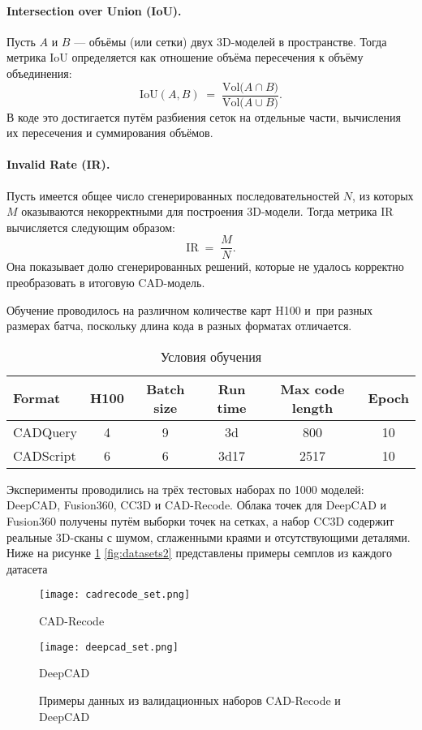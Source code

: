 \paragraph{Intersection over Union (IoU).}
Пусть \( A \) и \( B \) --- объёмы (или сетки) двух 3D-моделей в пространстве.
Тогда метрика IoU определяется как отношение объёма пересечения к объёму объединения:
\[
    \mathrm{IoU}(A, B) \;=\; \frac{\mathrm{Vol}\bigl(A \cap B\bigr)}
    {\mathrm{Vol}\bigl(A \cup B\bigr)}.
\]
В коде это достигается путём разбиения сеток на отдельные части,
вычисления их пересечения и суммирования объёмов.

\paragraph{Invalid Rate (IR).}
Пусть имеется общее число сгенерированных последовательностей \(N\),
из которых \(M\) оказываются некорректными для построения 3D-модели.
Тогда метрика IR вычисляется следующим образом:
\[
    \mathrm{IR} \;=\; \frac{M}{N}.
\]
Она показывает долю сгенерированных решений, которые не удалось корректно
преобразовать в итоговую CAD-модель.

Обучение проводилось на различном количестве карт H100 и~при разных размерах
батча, поскольку длина кода в разных форматах отличается.

\begin{table}[h!]
    \centering
    \caption{Условия обучения}
    \begin{tabular}{|l|c|c|c|c|c|}
        \hline
        Format    & H100 & Batch size & Run time & Max code length & Epoch \\ \hline
        CADQuery  & 4    & 9          & 3d       & 800             & 10    \\ \hline
        CADScript & 6    & 6          & 3d17     & 2517            & 10    \\ \hline
    \end{tabular}
\end{table}

Эксперименты проводились на трёх тестовых наборах по 1000 моделей: DeepCAD,
Fusion360, CC3D и CAD-Recode. Облака точек для DeepCAD и Fusion360 получены путём выборки точек на сетках, а набор
CC3D содержит реальные 3D-сканы с шумом, сглаженными краями и отсутствующими деталями.
Ниже на рисунке \ref{fig:datasets1} \ref{fig:datasets2} представлены примеры семплов из каждого датасета

\newpage

\begin{figure}[h!]
    \centering
    \texttt{[image: cadrecode\_set.png]}
    \caption{CAD-Recode}

    \vspace{1em} %

    \texttt{[image: deepcad\_set.png]}
    \caption{DeepCAD}

    \caption{Примеры данных из валидационных наборов CAD-Recode и DeepCAD}
    \label{fig:datasets1}
\end{figure}

